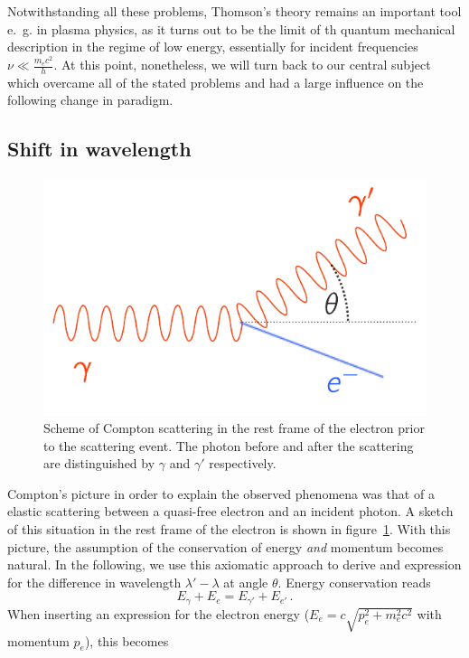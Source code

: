 Notwithstanding all these problems, Thomson's theory remains an important tool e.~g. in plasma physics, as it turns out to
be the limit of th quantum mechanical description in the regime of low energy, essentially for incident frequencies 
$\nu \ll \frac{m_ec^2}{h}$. At this point, nonetheless, we will turn back to our central subject which overcame all of the
stated problems and had a large influence on the following change in paradigm. 

\subsection{Shift in wavelength}
\label{sec:wavelength}
\begin{figure}[htpb]
    \centering
    \includegraphics[width=0.8\linewidth]{figures/compton_scatter}
    \caption{
        Scheme of Compton scattering in the rest frame of the electron prior to the scattering event. The photon before and
        after the scattering are distinguished by $\gamma$ and $\gamma'$ respectively. 
        }
    \label{fig:compton_scatter}
\end{figure}
Compton's picture in order to explain the observed phenomena was that of a elastic scattering between a quasi-free electron
and an incident photon. A sketch of this situation in the rest frame of the electron is shown in 
figure~\ref{fig:compton_scatter}. With this picture, the assumption of the conservation of energy \textit{and} momentum 
becomes natural. In the following, we use this axiomatic approach to derive and expression for the difference in
wavelength $\lambda' - \lambda$ at angle $\theta$. Energy conservation reads 
\begin{equation}
    E_\gamma + E_e =  E_{\gamma'} + E_{e'} \, .
    \label{eq:energy_conservation}
\end{equation}
When inserting an expression for the electron energy ($E_e = c\sqrt{p_e^2 + m_e^2c^2}$ with momentum $p_e$), this becomes 
